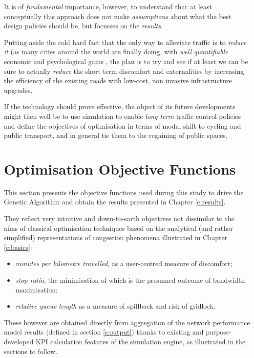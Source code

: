 It is of \emph{fundamental} importance, however, to understand that at least conceptually this approach does not make \emph{assumptions} about what the best design policies should be, but focusses on the \emph{results}.

Putting aside the cold hard fact that the only way to alleviate traffic is to \emph{reduce it} (as many cities around the world are finally doing, with \emph{well quantifiable} economic and psychological gains \citep{flusche2012bicycling}, the plan is to try and see if at least we can be sure to actually \emph{reduce} the short term discomfort and externalities by increasing the efficiency of the existing roads with low-cost, non invasive infrastructure upgrades.

If the technology should prove effective, the object of its future developments might then well be to use simulation to enable \emph{long term} traffic control policies and define the objectives of optimisation in terms of modal shift to cycling and public transport, and in general tie them to the regaining of public spaces.

\section{Optimisation Objective Functions}

This section presents the objective functions used during this study to drive the Genetic Algorithm and obtain the results presented in Chapter \ref{c:results}.

They reflect very intuitive and down-to-earth objectives not dissimilar to the aims of classical optimisation techniques based on the analytical (and rather simplified) representations of congestion phenomena illustrated in Chapter \ref{c:basics}:
\begin{itemize}
\item \emph{minutes per kilometre travelled}, as a user-centred measure of discomfort;
\item \emph{stop ratio}, the minimisation of which is the presumed outcome of bandwidth maximisation;
\item \emph{relative queue length} as a measure of spillback and risk of gridlock.
\end{itemize}
These however are obtained directly from aggregation of the network performance model results (defined in section \ref{s:output}) thanks to existing and purpose-developed KPI calculation features of the simulation engine, as illustrated in the sections to follow.

